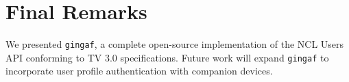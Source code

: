 \documentclass[sigconf,authorversion,review,authordraft]{webmedia}
\begin{document}
\section{Final Remarks}
\label{sec:remarks}

We presented \texttt{gingaf}, a complete open-source implementation of the NCL Users API conforming to TV 3.0 specifications. Future work will expand \texttt{gingaf} to incorporate user profile authentication with companion devices.



\end{document}
